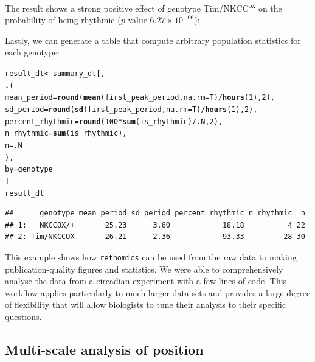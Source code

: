 \documentclass[10pt,letterpaper]{article}\usepackage[]{graphicx}\usepackage[]{color}
\makeatletter
\newcommand{\hlnum}[1]{\textcolor[rgb]{0.686,0.059,0.569}{#1}}%
\newcommand{\hlopt}[1]{\textcolor[rgb]{0,0,0}{#1}}%
\newcommand{\hlstd}[1]{\textcolor[rgb]{0.345,0.345,0.345}{#1}}%
\newcommand{\hlkwb}[1]{\textcolor[rgb]{0.69,0.353,0.396}{#1}}%
\newcommand{\hlkwc}[1]{\textcolor[rgb]{0.333,0.667,0.333}{#1}}%
\newcommand{\hlkwd}[1]{\textcolor[rgb]{0.737,0.353,0.396}{\textbf{#1}}}%
\newenvironment{kframe}{%
 \def\at@end@of@kframe{}%
 \ifinner\ifhmode%
  \def\at@end@of@kframe{\end{minipage}}%
  \begin{minipage}{\columnwidth}%
 \fi\fi%
 \def\FrameCommand##1{\hskip\@totalleftmargin \hskip-\fboxsep
 \colorbox{shadecolor}{##1}\hskip-\fboxsep
     \hskip-\linewidth \hskip-\@totalleftmargin \hskip\columnwidth}%
 \MakeFramed {\advance\hsize-\width
   \@totalleftmargin\z@ \linewidth\hsize
   \@setminipage}}%
 {\par\unskip\endMakeFramed%
 \at@end@of@kframe}
\newenvironment{knitrout}{}{} %
\makeatother
\begin{document}
The result shows a strong positive effect of genotype Tim/NKCC\textsuperscript{ox} on the probability of being rhythmic ($p$-value $6.27 \times 10^{-06}$):

Lastly, we can generate a table that compute arbitrary population statistics for each genotype:
\begin{knitrout}
\color{fgcolor}\begin{kframe}
\begin{alltt}
\hlstd{result_dt} \hlkwb{<-} \hlstd{summary_dt[,}
          \hlkwd{.}\hlstd{(}
            \hlkwc{mean_period} \hlstd{=} \hlkwd{round}\hlstd{(}\hlkwd{mean}\hlstd{(first_peak_period,} \hlkwc{na.rm} \hlstd{= T)} \hlopt{/} \hlkwd{hours}\hlstd{(}\hlnum{1}\hlstd{),} \hlnum{2}\hlstd{),}
            \hlkwc{sd_period} \hlstd{=} \hlkwd{round}\hlstd{(}\hlkwd{sd}\hlstd{(first_peak_period,} \hlkwc{na.rm} \hlstd{= T)} \hlopt{/} \hlkwd{hours}\hlstd{(}\hlnum{1}\hlstd{),} \hlnum{2}\hlstd{),}
            \hlkwc{percent_rhythmic} \hlstd{=} \hlkwd{round}\hlstd{(}\hlnum{100} \hlopt{*} \hlkwd{sum}\hlstd{(is_rhythmic)} \hlopt{/} \hlstd{.N,} \hlnum{2}\hlstd{),}
            \hlkwc{n_rhythmic} \hlstd{=} \hlkwd{sum}\hlstd{(is_rhythmic),}
            \hlkwc{n} \hlstd{= .N}
            \hlstd{),}
          \hlkwc{by} \hlstd{= genotype}
          \hlstd{]}
\hlstd{result_dt}
\end{alltt}
\begin{verbatim}
##      genotype mean_period sd_period percent_rhythmic n_rhythmic  n
## 1:   NKCCOX/+       25.23      3.60            18.18          4 22
## 2: Tim/NKCCOX       26.21      2.36            93.33         28 30
\end{verbatim}
\end{kframe}
\end{knitrout}


This example shows how \texttt{rethomics} can be used from the raw data to making publication-quality figures and statistics.
We were able to comprehensively analyse the data from a circadian experiment with a few lines of code.
This workflow applies particularly to much larger data sets and provides a large degree of flexibility that will allow biologists to tune their analysis to their specific questions.


\subsection*{Multi-scale analysis of position}
\end{document}
